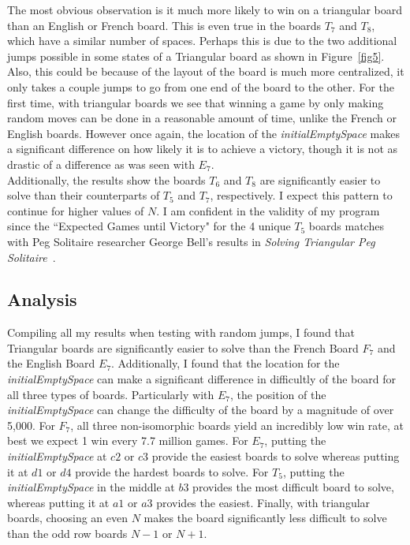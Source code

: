 \documentclass{article}
\newcommand\tab[1][.5cm]{\hspace*{#1}}
\begin{document}
The most obvious observation is it much more likely to win on a triangular board than an English or French board. This is even true in the boards $T_7$ and $T_8$, which have a similar number of spaces. Perhaps this is due to the two additional jumps possible in some states of a Triangular board as shown in Figure~\ref{fig5}. Also, this could be because of the layout of the board is much more centralized, it only takes a couple jumps to go from one end of the board to the other. For the first time, with triangular boards we see that winning a game by only making random moves can be done in a reasonable amount of time, unlike the French or English boards. However once again, the location of the \textit{initialEmptySpace} makes a significant difference on how likely it is to achieve a victory, though it is not as drastic of a difference as was seen with $E_7$.\\
\tab Additionally, the results show the boards $T_6$ and $T_8$ are significantly easier to solve than their counterparts of $T_5$ and $T_7$, respectively. I expect this pattern to continue for higher values of $N$. I am confident in the validity of my program since the ``Expected Games until Victory" for the 4 unique $T_5$ boards matches with Peg Solitaire researcher George Bell's results in \textit{Solving Triangular Peg Solitaire}~\cite{Bell}.

\subsection{Analysis}
Compiling all my results when testing with random jumps, I found that Triangular boards are significantly easier to solve than the French Board $F_7$ and the English Board $E_7$. Additionally, I found that the location for the \textit{initialEmptySpace} can make a significant difference in difficultly of the board for all three types of boards. Particularly with $E_7$, the position of the \textit{initialEmptySpace} can change the difficulty of the board by a magnitude of over 5,000. For $F_7$, all three non-isomorphic boards yield an incredibly low win rate, at best we expect 1 win every 7.7 million games. For $E_7$, putting the \textit{initialEmptySpace} at $c2$ or $c3$ provide the easiest boards to solve whereas putting it at $d1$ or $d4$ provide the hardest boards to solve. For $T_5$, putting the \textit{initialEmptySpace} in the middle at $b3$ provides the most difficult board to solve, whereas putting it at $a1$ or $a3$ provides the easiest. Finally, with triangular boards, choosing an even $N$ makes the board significantly less difficult to solve than the odd row boards $N-1$ or $N+1$.
 
\end{document}
